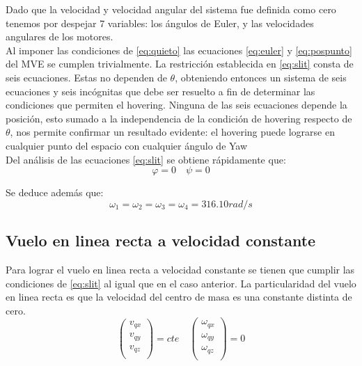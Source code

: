 \documentclass[main]{subfiles}
\begin{document}
Dado que la velocidad y velocidad angular del sistema fue definida como cero tenemos por despejar 7 variables: los \'angulos de Euler, y las velocidades angulares de los motores. \\

Al imponer las condiciones de \ref{eq:quieto} las ecuaciones \ref{eq:euler} y \ref{eq:pospunto} del MVE se cumplen trivialmente. La restricci\'on establecida en \ref{eq:slit} consta de seis ecuaciones. Estas no dependen de $\theta$, obteniendo entonces un sistema de seis ecuaciones y seis inc\'ognitas que debe ser resuelto a fin de determinar las condiciones que permiten el hovering. Ninguna de las seis ecuaciones depende la posici\'on, esto sumado a la independencia de la condici\'on de hovering respecto de $\theta$, nos permite confirmar un resultado evidente: el hovering puede lograrse en cualquier punto del espacio con cualquier \'angulo de Yaw\\

Del an\'alisis de las ecuaciones \ref{eq:slit} se obtiene r\'apidamente que:
\begin{equation}
\varphi=0 \quad \psi=0
\end{equation}

Se deduce adem\'as que:
\begin{equation}
\omega_1=\omega_2=\omega_3=\omega_4=316.10 rad/s
\end{equation}

\subsection{Vuelo en linea recta a velocidad constante}

Para lograr el vuelo en linea recta a velocidad constante se tienen que cumplir las condiciones de \ref{eq:slit} al igual que en el caso anterior. La particularidad del vuelo en linea recta es que la velocidad del centro de masa es una constante distinta de cero. 
\begin{equation}
\label{eq:recta}
\left(\begin{array}{c}
v_{qx}\\
v_{qy}\\
v_{qz}\\
\end{array}\right)=cte \quad
\left(\begin{array}{c}
\omega_{qx}\\
\omega_{qy}\\
\omega_{qz}\\
\end{array}\right)=0
\end{equation}
\end{document}
